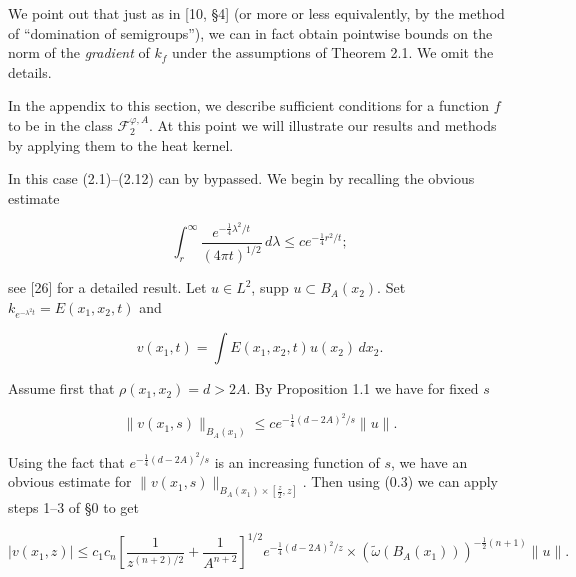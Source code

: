 \begin{remark}
\label{rem:gradient-kernel-estimate}
We point out that just as in [10, \S 4] (or more or less equivalently, by the method of ``domination of semigroups''), we can in fact obtain pointwise bounds on the norm of the \textit{gradient} of $k_f$ under the assumptions of Theorem 2.1. We omit the details.
\end{remark}

In the appendix to this section, we describe sufficient conditions for a function $f$ to be in the class $\mathcal{F}^{\varphi,A}_2$. At this point we will illustrate our results and methods by applying them to the heat kernel.

\begin{example}
\label{ex:heat-kernel}
In this case (2.1)--(2.12) can by bypassed. We begin by recalling the obvious estimate

\begin{equation}\tag{2.17}
\int_r^\infty \frac{e^{-\frac14 \lambda^2/t}}{(4\pi t)^{1/2}}\, d\lambda \le ce^{-\frac14 r^2/t};
\end{equation}

see [26] for a detailed result. Let $u \in L^2$, supp $u \subset B_A(x_2)$. Set $k_{e^{-\lambda^2 t}} = E(x_1,x_2,t)$ and

\begin{equation}\tag{2.18}
v(x_1,t)=\int E(x_1,x_2,t)u(x_2)\, dx_2.
\end{equation}

Assume first that $\rho(x_1,x_2)=d>2A$. By Proposition 1.1 we have for fixed $s$

\begin{equation}\tag{2.19}
\|v(x_1,s)\|_{B_A(x_1)} \le ce^{-\frac14(d-2A)^2/s}\|u\|.
\end{equation}

Using the fact that $e^{-\frac14(d-2A)^2/s}$ is an increasing function of $s$, we have an obvious estimate for $\|v(x_1,s)\|_{B_A(x_1)\times[\frac{z}{2},z]}$. Then using (0.3) we can apply steps 1--3 of \S0 to get

\begin{equation}\tag{2.20}
|v(x_1,z)| \le c_1 c_n \left[\frac{1}{z^{(n+2)/2}} + \frac{1}{A^{n+2}}\right]^{1/2} e^{-\frac14(d-2A)^2/z}
\times \left(\widetilde{\omega}(B_A(x_1))\right)^{-\frac12(n+1)}\|u\|.
\end{equation}


\end{example}

